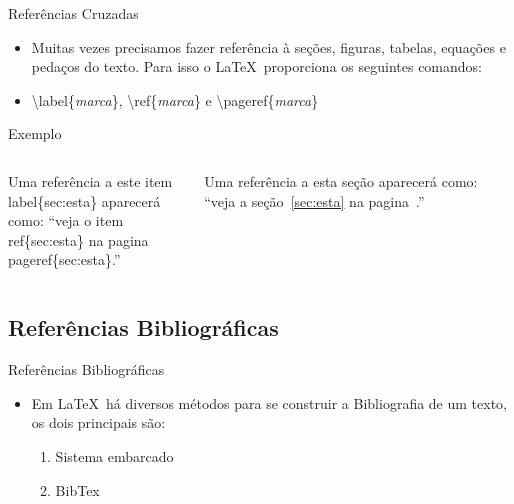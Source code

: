 \begin{frame}[fragile]{Referências Cruzadas}
    
    \begin{itemize}
    \item Muitas vezes precisamos fazer referência à seções, figuras, tabelas, equações e pedaços do texto. Para isso o \LaTeX\ proporciona os seguintes comandos:
    \vspace{6pt}
    \item[] \alert{\textbackslash label\{\textit{marca}\}, \textbackslash ref\{\textit{marca}\} e \textbackslash pageref\{\textit{marca}\}}
    \vspace{6pt}
    \end{itemize}
    
    \begin{exampleblock}{Exemplo}
    \begin{columns}
        {\small
\begin{semiverbatim}
  Uma referência a este item 
  \alert{\\label\{sec:esta\}} aparecerá 
  como: ``veja o item
  \alert{~\\ref\{sec:esta\}} na pagina
  \alert{~\\pageref\{sec:esta\}}.''
\end{semiverbatim}
        }
        {\small
        Uma referência a esta seção \alert{\label{sec:esta}} aparecerá como: ``veja a seção~\alert{\ref{sec:esta}} na pagina~\alert{\pageref{sec:esta}}.''
        }
    \end{columns}
    \end{exampleblock}
\end{frame}

\subsection{Referências Bibliográficas}

\begin{frame}{Referências Bibliográficas}

  \begin{itemize}
    \item Em \LaTeX\ há diversos métodos para se construir a Bibliografia de um texto, os dois principais são:
 
    \begin{enumerate}
        \item Sistema embarcado
        \item BibTex
    \end{enumerate}
  \end{itemize}

\end{frame}

